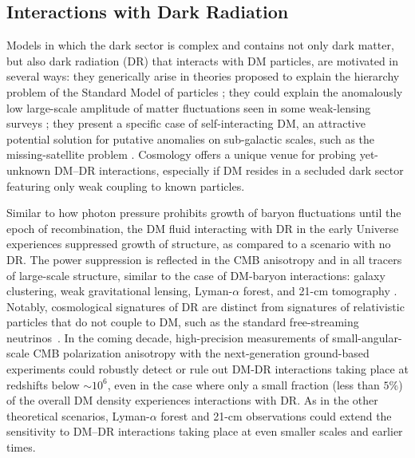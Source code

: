 \documentclass[12pt]{article}
\begin{document}
\vspace{-0.3cm}
\subsection{Interactions with Dark Radiation}

Models in which the dark sector is complex and contains not only dark matter, but also dark radiation (DR) that interacts with DM particles, are motivated in several ways: they generically arise in theories proposed to explain the hierarchy problem of the Standard Model of particles \cite{Arkani-Hamed:2016rle, Chacko:2018vss}; they could explain the anomalously low large-scale amplitude of matter fluctuations seen in some weak-lensing surveys \cite{Lesgourgues:2015wza,Chacko:2016kgg,Buen-Abad:2017gxg,Krall:2017xcw}; they present a specific case of self-interacting DM, an attractive potential solution for putative anomalies on sub-galactic scales, such as the missing-satellite problem \cite{Tulin:2012wi,Tulin:2013teo,Kaplinghat:2015aga,Bullock:2017xww}. 
Cosmology offers a unique venue for probing yet-unknown DM--DR interactions, especially if DM resides in a secluded dark sector featuring only weak coupling to known particles.

Similar to how photon pressure prohibits growth of baryon fluctuations until the epoch of recombination, the DM fluid interacting with DR in the early Universe experiences suppressed growth of structure, as compared to a scenario with no DR. 
The power suppression is reflected in the CMB anisotropy and in all tracers of large-scale structure, similar to the case of DM-baryon interactions: galaxy clustering, weak gravitational lensing, Lyman-$\alpha$ forest, and 21-cm tomography \cite{Boehm:2001hm,Cyr-Racine:2013fsa,Cyr-Racine:2015ihg}. 
Notably, cosmological signatures of DR are distinct from signatures of relativistic particles that do not couple to DM, such as the standard free-streaming neutrinos~\cite{Bashinsky:2003tk,Follin:2015hya,Baumann:2015rya}.
In the coming decade, high-precision measurements of small-angular-scale CMB polarization anisotropy with the next-generation ground-based experiments could robustly detect or rule out DM-DR interactions taking place at redshifts below $\sim10^6$, even in the case where only a small fraction (less than $5\%$) of the overall DM density experiences interactions with DR. 
As in the other theoretical scenarios, Lyman-$\alpha$ forest and 21-cm observations could extend the sensitivity to DM--DR interactions taking place at even smaller scales and earlier times. 
\end{document}
